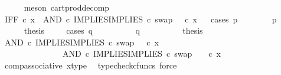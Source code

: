 \begin{isabellebody}
\ \ \ \ \isamarkupfalse%
\ {\isacharparenleft}{\kern0pt}meson\ cart{\isacharunderscore}{\kern0pt}prod{\isacharunderscore}{\kern0pt}decomp{\isacharparenright}{\kern0pt}\isanewline
\ \ \isamarkupfalse%
\ {\isachardoublequoteopen}IFF\ {\isasymcirc}\isactrlsub c\ x\ {\isacharequal}{\kern0pt}\ {\isacharparenleft}{\kern0pt}AND\ {\isasymcirc}\isactrlsub c\ {\isasymlangle}IMPLIES{\isacharcomma}{\kern0pt}IMPLIES\ {\isasymcirc}\isactrlsub c\ swap\ {\isasymOmega}\ {\isasymOmega}{\isasymrangle}{\isacharparenright}{\kern0pt}\ {\isasymcirc}\isactrlsub c\ x{\isachardoublequoteclose}\isanewline
\ \ \isamarkupfalse%
{\isacharparenleft}{\kern0pt}cases\ {\isachardoublequoteopen}p\ {\isacharequal}{\kern0pt}\ {\isasymt}{\isachardoublequoteclose}{\isacharparenright}{\kern0pt}\isanewline
\ \ \ \ \isamarkupfalse%
\ {\isachardoublequoteopen}p\ {\isacharequal}{\kern0pt}\ {\isasymt}{\isachardoublequoteclose}\isanewline
\ \ \ \ \isamarkupfalse%
\ {\isacharquery}{\kern0pt}thesis\isanewline
\ \ \ \ \isamarkupfalse%
{\isacharparenleft}{\kern0pt}cases\ {\isachardoublequoteopen}q\ {\isacharequal}{\kern0pt}\ {\isasymt}{\isachardoublequoteclose}{\isacharparenright}{\kern0pt}\isanewline
\ \ \ \ \ \ \isamarkupfalse%
\ {\isachardoublequoteopen}q\ {\isacharequal}{\kern0pt}\ {\isasymt}{\isachardoublequoteclose}\isanewline
\ \ \ \ \ \ \isamarkupfalse%
\ {\isacharquery}{\kern0pt}thesis\isanewline
\ \ \ \ \ \ \isamarkupfalse%
\ {\isacharminus}{\kern0pt}\ \isanewline
\ \ \ \ \ \ \ \ \isamarkupfalse%
\ {\isachardoublequoteopen}{\isacharparenleft}{\kern0pt}AND\ {\isasymcirc}\isactrlsub c\ {\isasymlangle}IMPLIES{\isacharcomma}{\kern0pt}IMPLIES\ {\isasymcirc}\isactrlsub c\ swap\ {\isasymOmega}\ {\isasymOmega}{\isasymrangle}{\isacharparenright}{\kern0pt}\ {\isasymcirc}\isactrlsub c\ x\ {\isacharequal}{\kern0pt}\ \ \ \ \isanewline
\ \ \ \ \ \ \ \ \ \ \ \ \ \ \ AND\ {\isasymcirc}\isactrlsub c\ {\isasymlangle}IMPLIES{\isacharcomma}{\kern0pt}IMPLIES\ {\isasymcirc}\isactrlsub c\ swap\ {\isasymOmega}\ {\isasymOmega}{\isasymrangle}\ \ {\isasymcirc}\isactrlsub c\ x{\isachardoublequoteclose}\isanewline
\ \ \ \ \ \ \ \ \ \ \isamarkupfalse%
\ comp{\isacharunderscore}{\kern0pt}associative{}\ x{\isacharunderscore}{\kern0pt}type\ \isamarkupfalse%
\ {\isacharparenleft}{\kern0pt}typecheck{\isacharunderscore}{\kern0pt}cfuncs{\isacharcomma}{\kern0pt}\ force{\isacharparenright}{\kern0pt}\isanewline
\ \ \ \ \ \ \ \ \isamarkupfalse%

\end{isabellebody}
